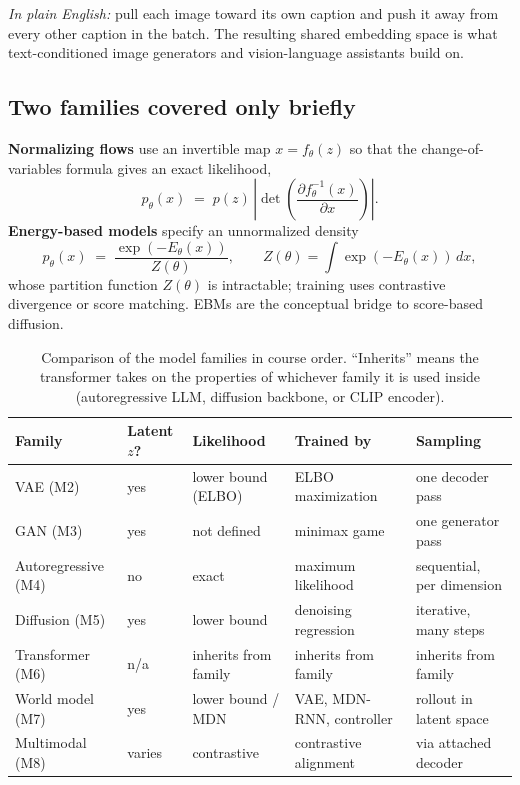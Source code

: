 \documentclass[11pt]{article}
\theoremstyle{remark}
\begin{document}
\noindent\textit{In plain English:} pull each image toward its own caption and push it away from every other caption in the batch. The resulting shared embedding space is what text-conditioned image generators and vision-language assistants build on.

\subsection{Two families covered only briefly}

\textbf{Normalizing flows} use an invertible map $x = f_\theta(z)$ so that the change-of-variables formula gives an exact likelihood,
\[
p_\theta(x) \;=\; p(z)\,\left|\det\!\left(\frac{\partial f_\theta^{-1}(x)}{\partial x}\right)\right| .
\]
\textbf{Energy-based models} specify an unnormalized density
\[
p_\theta(x) \;=\; \frac{\exp(-E_\theta(x))}{Z(\theta)}, \qquad Z(\theta) = \int \exp(-E_\theta(x))\, dx ,
\]
whose partition function $Z(\theta)$ is intractable; training uses contrastive divergence or score matching. EBMs are the conceptual bridge to score-based diffusion.

\begin{table}[ht]
\centering\footnotesize
\setlength{\tabcolsep}{4pt}
\begin{tabular}{@{}l l l l l@{}}
\toprule
\textbf{Family} & \textbf{Latent $z$?} & \textbf{Likelihood} & \textbf{Trained by} & \textbf{Sampling} \\
\midrule
VAE (M2)            & yes & lower bound (ELBO)   & ELBO maximization        & one decoder pass \\
GAN (M3)            & yes & not defined          & minimax game             & one generator pass \\
Autoregressive (M4) & no  & exact                & maximum likelihood       & sequential, per dimension \\
Diffusion (M5)      & yes & lower bound          & denoising regression     & iterative, many steps \\
Transformer (M6)    & n/a & inherits from family & inherits from family     & inherits from family \\
World model (M7)    & yes & lower bound / MDN    & VAE, MDN-RNN, controller & rollout in latent space \\
Multimodal (M8)     & varies & contrastive & contrastive alignment  & via attached decoder \\
\bottomrule
\end{tabular}
\caption{Comparison of the model families in course order. ``Inherits'' means the transformer takes on the properties of whichever family it is used inside (autoregressive LLM, diffusion backbone, or CLIP encoder).}
\label{tab:families}
\end{table}
\end{document}
